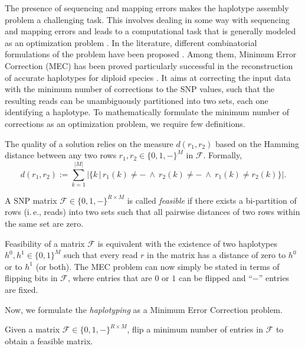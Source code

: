 The presence of sequencing and mapping errors makes the haplotype assembly problem a challenging task. 
This involves dealing in some way with sequencing and mapping errors and leads to
a computational task that is generally modeled as an optimization problem .
In the literature, different combinatorial formulations of the problem have been
proposed \citep{Aguiar2013, dondi2012new, lippert2002algorithmic}. Among them, Minimum Error Correction (MEC) \citep{lippert2002algorithmic} has
been proved particularly successful in the reconstruction of accurate haplotypes for
diploid species \citep{martin2016whatshap, He2010, CDW13_exact, GCR14_whole}. It aims at correcting the input data with the minimum
number of corrections to the SNP values, such that the resulting reads can be unambiguously partitioned into two sets, each one identifying a haplotype. 
To mathematically formulate the minimum number of corrections as an optimization problem, we require few definitions.

\begin{definition}[Distance] 
The quality of a solution relies on the measure $d(r_1,r_2)$ based on the Hamming distance between any two rows $r_1,r_2\in\{0,1, -\}^M$ in $\mathcal{F}$. Formally,
\[d(r_1,r_2):=\sum_{k=1}^{|M|} \big|\big\{k\,\big|\,r_1(k)\neq -\ \wedge\ r_2(k)\neq -\ \wedge\ r_1(k)\neq r_2(k)\big\}\big|.\]
\label{eq:distance}
\end{definition}

\begin{definition}[Feasibility]
A SNP matrix $\mathcal{F}\in\{0,1,-\}^{R\times M}$ is called \emph{feasible} if there exists a bi-partition of rows (i.\,e., reads) into two sets such that all pairwise distances of two rows within the same set are zero.
\end{definition}
Feasibility of a matrix $\mathcal{F}$ is equivalent with the existence of two haplotypes $h^0,h^1\in\{0,1\}^M$ such that every read $r$ in the matrix has a distance of zero to $h^0$ or to $h^1$ (or both).
The MEC problem can now simply be stated in terms of flipping bits in $\mathcal{F}$, where entries that are $0$ or $1$ can be flipped and ``$-$'' entries are fixed.

Now, we formulate the \textit{haplotyping} as a Minimum Error Correction problem.
\begin{problem}[MEC]
Given a matrix $\mathcal{F}\in\{0,1,-\}^{R\times M}$, flip a minimum number of entries in $\mathcal{F}$ to obtain a feasible matrix.
\end{problem}

